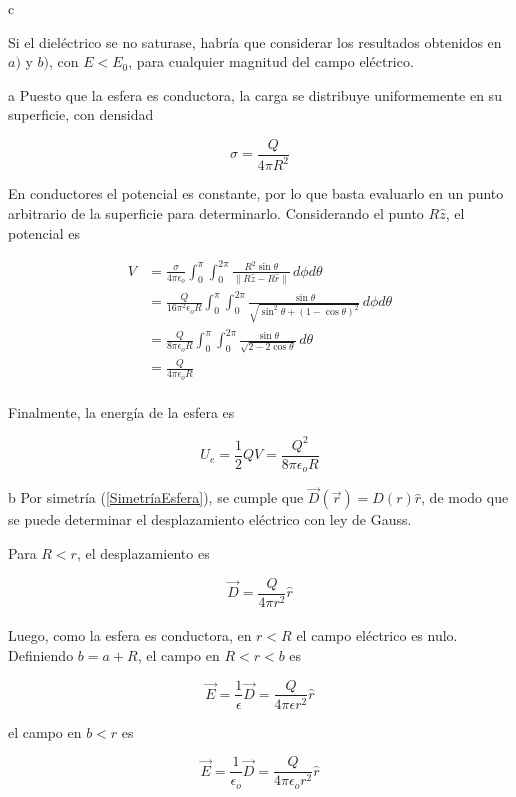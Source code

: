 \ics c

Si el dieléctrico se no saturase, habría que considerar los resultados obtenidos en $a)$ y $b)$, con $E<E_0$, para cualquier magnitud del campo eléctrico.

\bigbreak
\begin{solucion}{9}

\ics a 
Puesto que la esfera es conductora, la carga se distribuye uniformemente en su superficie, con densidad

\[\sigma = \frac{Q}{4\pi R^2}\]

En conductores el potencial es constante, por lo que basta evaluarlo en un punto arbitrario de la superficie para determinarlo. Considerando el punto $R\hat{z}$, el potencial es

\begin{equation}
\begin{split}
    V &= \frac{\sigma}{4\pi\epsilon_o}\int^{\pi}_0\int^{2\pi}_0\frac{R^2\sin{\theta}}{\|R\hat{z}-R\hat{r}\|}\,d\phi d\theta\\
    &= \frac{Q}{16\pi^2\epsilon_oR}\int^{\pi}_0\int^{2\pi}_0
    \frac{\sin{\theta}}{\sqrt{\sin^2\theta+(1-\cos\theta)^2}}\,d\phi d\theta\\
    &= \frac{Q}{8\pi\epsilon_oR}\int^{\pi}_0\int^{2\pi}_0
    \frac{\sin{\theta}}{\sqrt{2-2\cos\theta}}\,d\theta\\
    &= \frac{Q}{4\pi\epsilon_oR}\\
\end{split}
\nonumber
\end{equation}

Finalmente, la energía de la esfera es

\[U_e = \frac{1}{2}QV = \frac{Q^2}{8\pi\epsilon_oR}\]

\ics b 
Por simetría (\ref{SimetríaEsfera}), se  cumple que $\Vec{D}(\Vec{r})=D(r)\hat{r}$, de modo que se puede determinar el desplazamiento eléctrico con ley de Gauss.


Para $R<r$, el desplazamiento es

\[\Vec{D} = \frac{Q}{4\pi r^2}\hat{r}\]\\

Luego, como la esfera es conductora, en $r<R$ el campo eléctrico es nulo. Definiendo $b=a+R$, el campo en $R<r<b$ es

\[\Vec{E}=\frac{1}{\epsilon}\Vec{D}=\frac{Q}{4\pi\epsilon r^2}\hat{r}\]

el campo en $b<r$ es

\[\Vec{E}=\frac{1}{\epsilon_o}\Vec{D}=\frac{Q}{4\pi\epsilon_o r^2}\hat{r}\]\\


\end{solucion}
